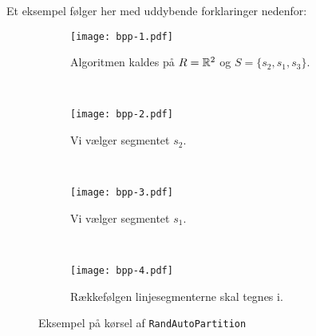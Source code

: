 Et eksempel følger her med uddybende forklaringer nedenfor:
\begin{figure}[H]
	\centering
	\begin{subfigure}[b]{0.48\textwidth}
		\texttt{[image: bpp-1.pdf]}
		\caption{Algoritmen kaldes på $R = {\mathbb R}^2$ og $S = \{s_2, s_1, s_3 \}$.}
		\label{fig:bpp-1}
	\end{subfigure}
	~
	\begin{subfigure}[b]{0.48\textwidth}
		\texttt{[image: bpp-2.pdf]}
        \caption{Vi vælger segmentet $s_2$.}
		\label{fig:bpp-2}
	\end{subfigure}
	~
	\begin{subfigure}[b]{0.48\textwidth}
		\texttt{[image: bpp-3.pdf]}
		\caption{Vi vælger segmentet $s_1$.}
		\label{fig:bpp-3}
	\end{subfigure}
	~
	\begin{subfigure}[b]{0.48\textwidth}
		\texttt{[image: bpp-4.pdf]}
		\caption{Rækkefølgen linjesegmenterne skal tegnes i.}
		\label{fig:bpp-4}
	\end{subfigure}
	\caption{Eksempel på kørsel af \texttt{RandAutoPartition}}
	\label{fig:bpp}
\end{figure}

